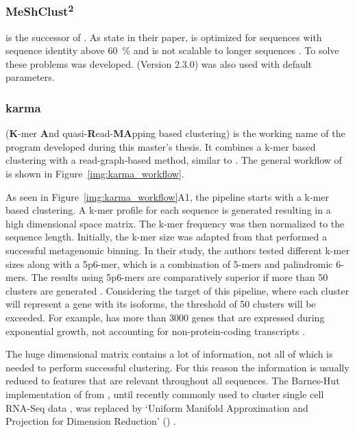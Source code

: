\documentclass[12pt,a4paper,english]{article}
\begin{document}
\subsubsection*{MeShClust\textsuperscript{2}}
	\mclusttwo \citep{meshclust2:18} is the successor of \mclust. As \citeauthor{meshclust:18} state in their paper, \mclust is optimized for sequences with sequence identity above 60~\% and is not scalable to longer sequences \citep{meshclust:18}. To solve these problems \mclusttwo was developed. \mclusttwo (Version 2.3.0) was also used with default parameters.

\subsubsection*{karma}
	\label{sssec:karma}
	\karma (\textbf{K}-mer \textbf{A}nd quasi-\textbf{R}ead-\textbf{MA}pping based clustering) is the working name of the program developed during this master's thesis. It combines a k-mer based clustering with a read-graph-based method, similar to \grouper. The general workflow of \karma is shown in Figure~\ref{img:karma_workflow}.
	
	As seen in Figure~\ref{img:karma_workflow}A1, the pipeline starts with a k-mer based clustering. A k-mer profile for each sequence is generated resulting in a high dimensional space matrix. The k-mer frequency was then normalized to the sequence length. Initially, the k-mer size was adapted from \citeauthor{binning:16} that performed a successful metagenomic binning. In their study, the authors tested different k-mer sizes along with a 5p6-mer, which is a combination of 5-mers and palindromic 6-mers. 
	The results using 5p6-mers are comparatively superior if more than 50 clusters are generated \citep{binning:16}.
	Considering the target of this pipeline, where each cluster will represent a gene with its isoforms, the threshold of 50 clusters will be exceeded. For example, \ecoli has more than 3000 genes that are expressed during exponential growth, not accounting for non-protein-coding transcripts \citep{ecoli:99}.
	
	The huge dimensional matrix contains a lot of information, not all of which is needed to perform successful clustering. For this reason the information is usually reduced to features that are relevant throughout all sequences. The Barnes-Hut implementation of \tsne from \citeauthor{binning:16}, until recently commonly used to cluster single cell RNA-Seq data \citep{tSNE_common:19}, was replaced by `Uniform Manifold Approximation and Projection for Dimension Reduction' (\umap) \citep{umap:18}.
\end{document}

